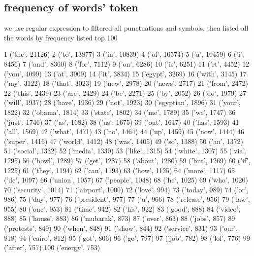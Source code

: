 \documentclass[a4paper, 11pt]{article}
\begin{document}
\subsection{frequency of words' token}
we use regular expression to filtered all punctuations and symbols, then listed all the words by frequency \newline
listed top 100
\begin{spverbatim}
1 ('the', 21126)
2 ('to', 13877)
3 ('in', 10839)
4 ('of', 10574)
5 ('a', 10459)
6 ('i', 8456)
7 ('and', 8360)
8 ('for', 7112)
9 ('on', 6286)
10 ('is', 6251)
11 ('rt', 4452)
12 ('you', 4099)
13 ('at', 3909)
14 ('it', 3834)
15 ('egypt', 3269)
16 ('with', 3145)
17 ('my', 3122)
18 ('that', 3023)
19 ('new', 2978)
20 ('news', 2717)
21 ('from', 2472)
22 ('this', 2439)
23 ('are', 2429)
24 ('be', 2271)
25 ('by', 2052)
26 ('do', 1979)
27 ('will', 1937)
28 ('have', 1936)
29 ('not', 1923)
30 ('egyptian', 1896)
31 ('your', 1822)
32 ('obama', 1814)
33 ('state', 1802)
34 ('me', 1789)
35 ('we', 1747)
36 ('just', 1746)
37 ('as', 1682)
38 ('us', 1675)
39 ('out', 1647)
40 ('has', 1593)
41 ('all', 1569)
42 ('what', 1471)
43 ('no', 1464)
44 ('up', 1459)
45 ('now', 1444)
46 ('super', 1416)
47 ('world', 1412)
48 ('was', 1405)
49 ('so', 1388)
50 ('an', 1372)
51 ('social', 1332)
52 ('media', 1330)
53 ('like', 1315)
54 ('white', 1307)
55 ('via', 1295)
56 ('bowl', 1289)
57 ('get', 1287)
58 ('about', 1280)
59 ('but', 1269)
60 ('if', 1225)
61 ('they', 1194)
62 ('can', 1193)
63 ('how', 1125)
64 ('more', 1117)
65 ('de', 1097)
66 ('union', 1057)
67 ('people', 1048)
68 ('he', 1025)
69 ('who', 1020)
70 ('security', 1014)
71 ('airport', 1000)
72 ('love', 994)
73 ('today', 989)
74 ('or', 986)
75 ('day', 977)
76 ('president', 977)
77 ('u', 966)
78 ('release', 956)
79 ('law', 955)
80 ('one', 953)
81 ('time', 942)
82 ('his', 922)
83 ('good', 888)
84 ('video', 888)
85 ('house', 883)
86 ('mubarak', 873)
87 ('over', 863)
88 ('jobs', 857)
89 ('protests', 849)
90 ('when', 848)
91 ('show', 844)
92 ('service', 831)
93 ('our', 818)
94 ('cairo', 812)
95 ('got', 806)
96 ('go', 797)
97 ('job', 782)
98 ('lol', 776)
99 ('after', 757)
100 ('energy', 753)	
\end{spverbatim}
\end{document}
